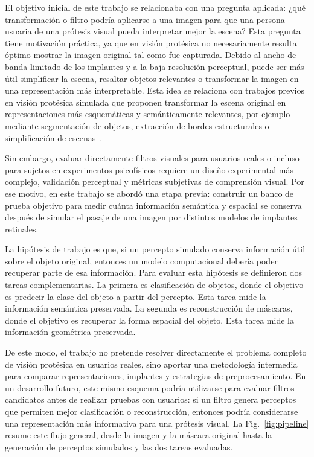 \documentclass[conference,a4paper]{IEEEtran}
\begin{document}
El objetivo inicial de este trabajo se relacionaba con una pregunta aplicada: ¿qué transformación o filtro podría aplicarse a una imagen para que una persona usuaria de una prótesis visual pueda interpretar mejor la escena? Esta pregunta tiene motivación práctica, ya que en visión protésica no necesariamente resulta óptimo mostrar la imagen original tal como fue capturada. Debido al ancho de banda limitado de los implantes y a la baja resolución perceptual, puede ser más útil simplificar la escena, resaltar objetos relevantes o transformar la imagen en una representación más interpretable. Esta idea se relaciona con trabajos previos en visión protésica simulada que proponen transformar la escena original en representaciones más esquemáticas y semánticamente relevantes, por ejemplo mediante segmentación de objetos, extracción de bordes estructurales o simplificación de escenas~\cite{han2021,sanchezgarcia2018}.

Sin embargo, evaluar directamente filtros visuales para usuarios reales o incluso para sujetos en experimentos psicofísicos requiere un diseño experimental más complejo, validación perceptual y métricas subjetivas de comprensión visual. Por ese motivo, en este trabajo se abordó una etapa previa: construir un banco de prueba objetivo para medir cuánta información semántica y espacial se conserva después de simular el pasaje de una imagen por distintos modelos de implantes retinales. 

La hipótesis de trabajo es que, si un percepto simulado conserva información útil sobre el objeto original, entonces un modelo computacional debería poder recuperar parte de esa información. Para evaluar esta hipótesis se definieron dos tareas complementarias. La primera es clasificación de objetos, donde el objetivo es predecir la clase del objeto a partir del percepto. Esta tarea mide la información semántica preservada. La segunda es reconstrucción de máscaras, donde el objetivo es recuperar la forma espacial del objeto. Esta tarea mide la información geométrica preservada.

De este modo, el trabajo no pretende resolver directamente el problema completo de visión protésica en usuarios reales, sino aportar una metodología intermedia para comparar representaciones, implantes y estrategias de preprocesamiento. En un desarrollo futuro, este mismo esquema podría utilizarse para evaluar filtros candidatos antes de realizar pruebas con usuarios: si un filtro genera perceptos que permiten mejor clasificación o reconstrucción, entonces podría considerarse una representación más informativa para una prótesis visual. La Fig.~\ref{fig:pipeline} resume este flujo general, desde la imagen y la máscara original hasta la generación de perceptos simulados y las dos tareas evaluadas.
\end{document}
